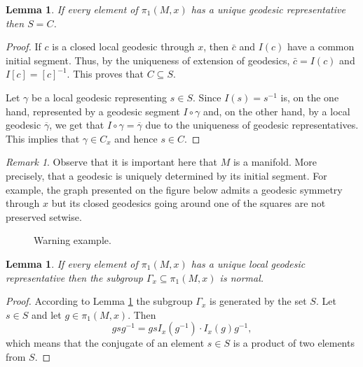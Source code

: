 \documentclass[12pt]{amsart}
\newtheorem{lemma}[subsection]{Lemma}
\theoremstyle{definition}
\theoremstyle{remark}
\newtheorem{remark}[subsection]{Remark}
\numberwithin{figure}{section}
\numberwithin{table}{section}
\numberwithin{equation}{section}
\begin{document}
\begin{lemma}\label{L:S=C}
If every element of $\pi_1(M,x)$ has a unique geodesic representative then 
$S = C$.
\end{lemma}
\begin{proof}
If $c$ is a closed local geodesic through $x$, then $\bar{c}$ and $I(c)$ 
have a common initial segment. Thus, by the uniqueness of extension of
geodesics, $\bar{c} = I(c)$ and $I[c] = [c]^{-1}$.
This proves that $C\subseteq S$.

Let $\gamma$ be a local geodesic representing $s\in S$. Since 
$I(s) = s^{-1}$ is, on the one hand, represented by a geodesic
segment $I\circ \gamma$ and, on the other hand, by a local geodesic
$\overline{\gamma}$, we get that $I\circ \gamma = \overline{\gamma}$
due to the uniqueness of geodesic representatives. This implies that
$\gamma \in C_x$ and hence $s\in C$.
\end{proof}

\begin{remark}
Observe that it is important here that $M$ is a manifold. More precisely,
that a geodesic is uniquely determined by its initial segment. For example,
the graph presented on the figure below admits a geodesic
symmetry through $x$ but its closed geodesics going around one of the squares
are not preserved setwise.
\begin{figure}[h]\label{F:}
\caption{Warning example. }
\end{figure}
\end{remark}



\begin{lemma}\label{L:normal}
If every element of $\pi_1(M,x)$ has a unique local geodesic representative then 
the subgroup $\Gamma_x\subseteq \pi_1(M,x)$ is normal.
\end{lemma}
\begin{proof}
According to Lemma \ref{L:S=C} the subgroup $\Gamma_x$ is generated by
the set $S$. Let $s\in S$ and let $g\in \pi_1(M,x)$. Then
$$
gsg^{-1} = gsI_x(g^{-1}) \cdot I_x(g) g^{-1},
$$
which means that the conjugate of an element $s\in S$ is a product of
two elements from $S$.
\end{proof}
\end{document}
